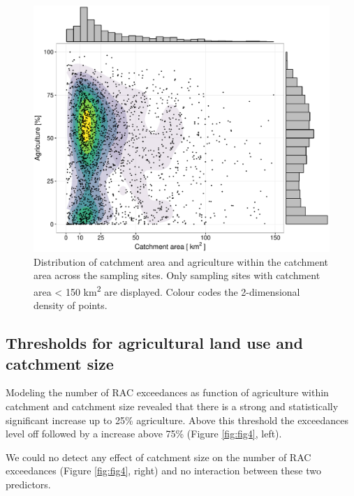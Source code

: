 \documentclass[journal=esthag,manuscript=article]{achemso}
\begin{document}
\begin{figure}[ht]
  \includegraphics[width=.8\textwidth]{figure3.pdf}
  \caption{Distribution of catchment area and agriculture within the catchment area across the sampling sites.
  Only sampling sites with catchment area < 150 km\textsuperscript{2} are displayed. 
  Colour codes the 2-dimensional density of points.
  }
  \label{fig:fig3}
\end{figure}



\subsection{Thresholds for agricultural land use and catchment size}

Modeling the number of RAC exceedances as function of agriculture within catchment and catchment size revealed that there is a strong and statistically significant increase up to 25\% agriculture.
Above this threshold the exceedances level off followed by a increase above 75\% (Figure \ref{fig:fig4}, left).

We could no detect any effect of catchment size on the number of RAC exceedances (Figure \ref{fig:fig4}, right) and no interaction between these two predictors.
\end{document}
